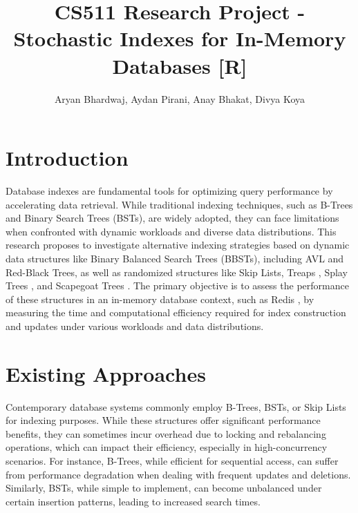 \documentclass[sigconf]{acmart}
\begin{document}
\title{CS511 Research Project - Stochastic Indexes for In-Memory Databases [R]}

\author{Aryan Bhardwaj, Aydan Pirani, Anay Bhakat, Divya Koya}


\maketitle

\section{Introduction}

Database indexes are fundamental tools for optimizing query performance by accelerating data retrieval. While traditional indexing techniques, such as B-Trees \cite{gao_2024_revisiting} and Binary Search Trees (BSTs), are widely adopted, they can face limitations when confronted with dynamic workloads and diverse data distributions. This research proposes to investigate alternative indexing strategies based on dynamic data structures like Binary Balanced Search Trees (BBSTs), including AVL and Red-Black Trees, as well as randomized structures like Skip Lists, Treaps \cite{treap}, Splay Trees \cite{algorithms}, and Scapegoat Trees \cite{algorithms}. The primary objective is to assess the performance of these structures in an in-memory database context, such as Redis \cite{redis}, by measuring the time and computational efficiency required for index construction and updates under various workloads and data distributions.

\section{Existing Approaches}

Contemporary database systems commonly employ B-Trees, BSTs, or Skip Lists \cite{prout_2019_the} for indexing purposes. While these structures offer significant performance benefits, they can sometimes incur overhead due to locking and rebalancing operations, which can impact their efficiency, especially in high-concurrency scenarios. For instance, B-Trees, while efficient for sequential access, can suffer from performance degradation when dealing with frequent updates and deletions. Similarly, BSTs, while simple to implement, can become unbalanced under certain insertion patterns, leading to increased search times.
\end{document}
